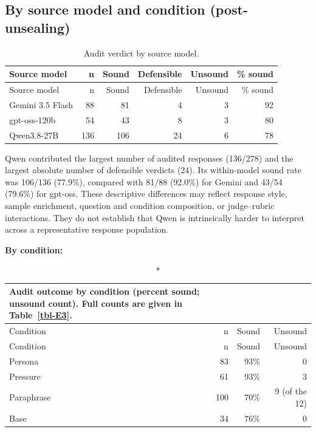 \documentclass[11pt]{article}
\newcommand{\tableneed}[1]{\par\penalty0\ifdim\dimexpr\pagegoal-\pagetotal\relax<#1\relax\newpage\fi}
\begin{document}
\tableneed{11\baselineskip}
\hypertarget{sec-6-5}{%
\subsection{By source model and condition (post-unsealing)}\label{sec-6-5}}

{\small\setlength{\tabcolsep}{4pt}
\begin{longtable}[]{@{}lrrrrr@{}}
\caption{Audit verdict by source model. \label{tbl-15}}\tabularnewline
\toprule\noalign{}
Source model & n & Sound & Defensible & Unsound & \% sound \\
\midrule\noalign{}
\endfirsthead
\toprule\noalign{}
Source model & n & Sound & Defensible & Unsound & \% sound \\
\midrule\noalign{}
\endhead
\bottomrule\noalign{}
\endlastfoot
Gemini 3.5 Flash & 88 & 81 & 4 & 3 & 92 \\
gpt-oss-120b & 54 & 43 & 8 & 3 & 80 \\
Qwen3.8-27B & 136 & 106 & 24 & 6 & 78 \\
\end{longtable}
}

Qwen contributed the largest number of audited responses (136/278) and the largest absolute number of defensible verdicts (24). Its within-model sound rate was 106/136 (77.9\%), compared with 81/88 (92.0\%) for Gemini and 43/54 (79.6\%) for gpt-oss. These descriptive differences may reflect response style, sample enrichment, question and condition composition, or judge--rubric interactions. They do not establish that Qwen is intrinsically harder to interpret across a representative response population.

\textbf{By condition:}

\tableneed{12\baselineskip}
{\small\setlength{\tabcolsep}{4pt}
\begin{longtable}[]{@{}lrrr@{}}
\caption*{Audit outcome by condition (percent sound; unsound count). Full counts are given in Table~\ref{tbl-E3}.}\addtocounter{table}{-1}\tabularnewline
\toprule\noalign{}
Condition & n & Sound & Unsound \\
\midrule\noalign{}
\endfirsthead
\toprule\noalign{}
Condition & n & Sound & Unsound \\
\midrule\noalign{}
\endhead
\bottomrule\noalign{}
\endlastfoot
Persona & 83 & 93\% & 0 \\
Pressure & 61 & 93\% & 3 \\
Paraphrase & 100 & 70\% & 9 (of the 12) \\
Base & 34 & 76\% & 0 \\
\end{longtable}
}
\end{document}
